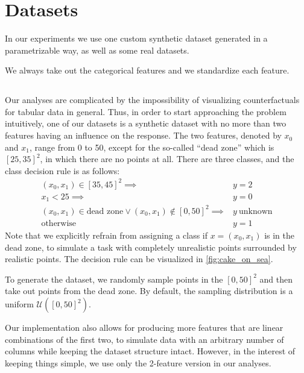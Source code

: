 \documentclass[../main.tex]{subfiles}
\begin{document}
\section{Datasets}
\label{sec:datasets}

In our experiments we use one custom synthetic dataset generated in a parametrizable way, as well as some real datasets.

We always take out the categorical features and we standardize each feature.

\subsection{\CakeOnSea}

Our analyses are complicated by the impossibility of visualizing counterfactuals for tabular data in general.
Thus, in order to start approaching the problem intuitively, one of our datasets is a synthetic dataset with no more than two features having an influence on the response.
The two features, denoted by $x_0$ and $x_1$, range from 0 to 50, except for the so-called ``dead zone'' which is $[25, 35]^2$, in which there are no points at all.
There are three classes, and the class decision rule is as follows:
\begin{align*}
    (x_0, x_1) \in [35, 45]^2 \implies & y = 2 \\
    x_1 < 25                  \implies & y = 0 \\
    (x_0, x_1) \in \text{dead zone} \lor (x_0, x_1) \notin [0, 50]^2  \implies & y\ \text{unknown} \\
    \text{otherwise} \qquad            & y = 1
\end{align*}
Note that we explicitly refrain from assigning a class if $x = (x_0, x_1)$ is in the dead zone, to simulate a task with completely unrealistic points surrounded by realistic points.
The decision rule can be visualized in \autoref{fig:cake_on_sea}.

To generate the dataset, we randomly sample points in the $[0, 50]^2$ and then take out points from the dead zone. By default, the sampling distribution is a uniform $\mathcal{U}([0, 50]^2)$.

Our implementation also allows for producing more features that are linear combinations of the first two, to simulate data with an arbitrary number of columns while keeping the dataset structure intact.
However, in the interest of keeping things simple, we use only the 2-feature version in our analyses.
\end{document}
